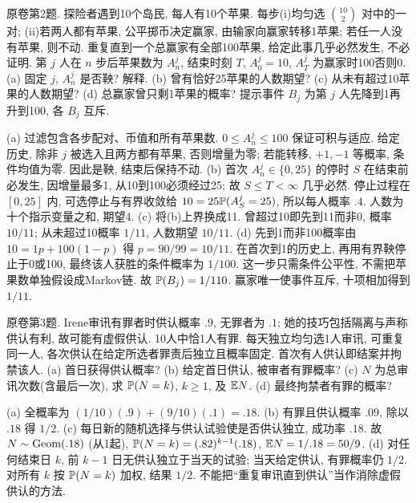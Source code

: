 \begin{exercise}\label{ex:fl19-2}
原卷第2题. 探险者遇到10个岛民, 每人有10个苹果. 每步(i)均匀选 $\binom{10}2$ 对中的一对; (ii)若两人都有苹果, 公平掷币决定赢家, 由输家向赢家转移1苹果; 若任一人没有苹果, 则不动. 重复直到一个总赢家有全部100苹果, 给定此事几乎必然发生, 不必证明. 第 $j$ 人在 $n$ 步后苹果数为 $A_n^j$, 结束时刻 $T$, $A_0^j=10$, $A_T^j$ 为赢家时100否则0. (a) 固定 $j$, $A_n^j$ 是否鞅? 解释. (b) 曾有恰好25苹果的人数期望? (c) 从未有超过10苹果的人数期望? (d) 总赢家曾只剩1苹果的概率? 提示事件 $B_j$ 为第 $j$ 人先降到1再升到100, 各 $B_j$ 互斥.
\end{exercise}
\begin{solution}
(a)\label{sol:fl19-2-a} 过滤包含各步配对、币值和所有苹果数. $0\leq A_n^j\leq100$ 保证可积与适应. 给定历史, 除非 $j$ 被选入且两方都有苹果, 否则增量为零; 若能转移, $+1,-1$ 等概率, 条件均值为零. 因此是鞅, 结束后保持不动.
(b)\label{sol:fl19-2-b} 首次 $A_n^j\in\{0,25\}$ 的停时 $S$ 在结束前必发生, 因增量最多1, 从10到100必须经过25; 故 $S\leq T<\infty$ 几乎必然. 停止过程在 $[0,25]$ 内, 可选停止与有界收敛给 $10=25\mathbb P(A_S^j=25)$, 所以每人概率 $.4$. 人数为十个指示变量之和, 期望4.
(c)\label{sol:fl19-2-c} 将(b)上界换成11. 曾超过10即先到11而非0, 概率 $10/11$; 从未超过10概率 $1/11$, 人数期望 $10/11$.
(d)\label{sol:fl19-2-d} 先到1而非100概率由 $10=1p+100(1-p)$ 得 $p=90/99=10/11$. 在首次到1的历史上, 再用有界鞅停止于0或100, 最终该人获胜的条件概率为 $1/100$. 这一步只需条件公平性, 不需把苹果数单独假设成Markov链. 故 $\mathbb P(B_j)=1/110$. 赢家唯一使事件互斥, 十项相加得到 $1/11$.
\end{solution}

\begin{exercise}\label{ex:fl19-3}
原卷第3题. Irene审讯有罪者时供认概率 $.9$, 无罪者为 $.1$; 她的技巧包括隔离与声称供认有利, 故可能有虚假供认. 10人中恰1人有罪. 每天独立均匀选1人审讯, 可重复同一人, 各次供认在给定所选者罪责后独立且概率固定. 首次有人供认即结案并拘禁该人. (a) 首日获得供认概率? (b) 给定首日供认, 被审者有罪概率? (c) $N$ 为总审讯次数(含最后一次), 求 $\mathbb P(N=k)$, $k\geq1$, 及 $\mathbb E N$. (d) 最终拘禁者有罪的概率?
\end{exercise}
\begin{solution}
(a)\label{sol:fl19-3-a} 全概率为 $(1/10)(.9)+(9/10)(.1)=.18$.
(b)\label{sol:fl19-3-b} 有罪且供认概率 $.09$, 除以 $.18$ 得 $1/2$.
(c)\label{sol:fl19-3-c} 每日新的随机选择与供认试验使是否供认独立, 成功率 $.18$. 故 $N\sim\operatorname{Geom}(.18)$ (从1起), $\mathbb P(N=k)=(.82)^{k-1}(.18)$, $\mathbb E N=1/.18=50/9$.
(d)\label{sol:fl19-3-d} 对任何结束日 $k$, 前 $k-1$ 日无供认独立于当天的试验; 当天给定供认, 有罪概率仍 $1/2$. 对所有 $k$ 按 $\mathbb P(N=k)$ 加权, 结果 $1/2$. 不能把``重复审讯直到供认''当作消除虚假供认的方法.
\end{solution}

